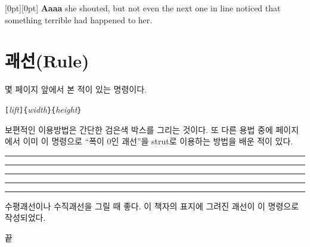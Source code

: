 \begin{example}
\raisebox{0pt}[0pt][0pt]{\Large%
\textbf{Aaaa\raisebox{-0.3ex}{a}%
\raisebox{-0.7ex}{aa}%
\raisebox{-1.2ex}{r}%
\raisebox{-2.2ex}{g}%
\raisebox{-4.5ex}{h}}}
she shouted, but not even the next
one in line noticed that something
terrible had happened to her.
\end{example}

\section{괘선(Rule)}
\label{sec:rule}

몇 페이지 앞에서 본 적이 있는 명령이다.

\begin{lscommand}
\verb|[|\emph{lift}\verb|]{|\emph{width}\verb|}{|\emph{height}\verb|}|
\end{lscommand}

\noindent 보편적인 이용방법은 간단한 검은색 박스를 그리는 것이다.
또 다른 용법 중에
\pageref{strutrule}페이지에서 이미 이 명령으로 ``폭이 0인 괘선''을 strut로 이용하는 
방법을 배운 적이 있다.

\begin{example}
\rule{3mm}{.1pt}%
\rule[-1mm]{5mm}{1cm}%
\rule{3mm}{.1pt}%
\rule[1mm]{1cm}{5mm}%
\rule{3mm}{.1pt}
\end{example}

\noindent 수평괘선이나 수직괘선을 그릴 때 좋다. 이 책자의 표지에 그려진 괘선이 이 명령으로 작성되었다. 

\bigskip
{\flushright 끝\par}


